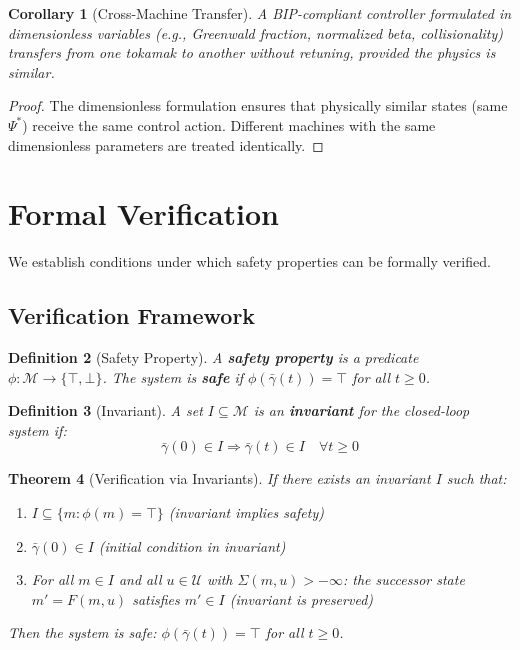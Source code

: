 \documentclass[11pt]{article}
\newtheorem{theorem}{Theorem}[section]
\newtheorem{corollary}[theorem]{Corollary}
\newtheorem{definition}[theorem]{Definition}
\begin{document}
\begin{corollary}[Cross-Machine Transfer]
A BIP-compliant controller formulated in dimensionless variables (e.g., Greenwald fraction, normalized beta, collisionality) transfers from one
tokamak to another without retuning, provided the physics is similar.
\end{corollary}

\begin{proof}
The dimensionless formulation ensures that physically similar states (same $\Psi^*$) receive
the same control action. Different machines with the same dimensionless parameters are treated
identically.
\end{proof}

\section{Formal Verification}

We establish conditions under which safety properties can be formally verified.

\subsection{Verification Framework}

\begin{definition}[Safety Property]
A \textbf{safety property} is a predicate $\phi : \mathcal{M} \to \{\top, \bot\}$. The
system is \textbf{safe} if $\phi(\bar{\gamma}(t)) = \top$ for all $t \geq 0$.
\end{definition}

\begin{definition}[Invariant]
A set $I \subseteq \mathcal{M}$ is an \textbf{invariant} for the closed-loop system if:
\[
\bar{\gamma}(0) \in I \Rightarrow \bar{\gamma}(t) \in I \quad \forall t \geq 0
\]
\end{definition}

\begin{theorem}[Verification via Invariants]
\label{thm:verification}
If there exists an invariant $I$ such that:
\begin{enumerate}
    \item[(i)] $I \subseteq \{m : \phi(m) = \top\}$ (invariant implies safety)
    \item[(ii)] $\bar{\gamma}(0) \in I$ (initial condition in invariant)
    \item[(iii)] For all $m \in I$ and all $u \in \mathcal{U}$ with $\Sigma(m, u) > -\infty$: the successor state $m' = F(m, u)$ satisfies $m' \in I$ (invariant is preserved)
\end{enumerate}
Then the system is safe: $\phi(\bar{\gamma}(t)) = \top$ for all $t \geq 0$.
\end{theorem}
\end{document}
